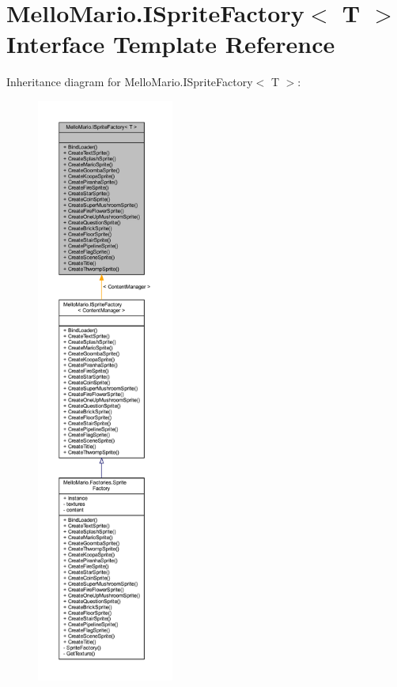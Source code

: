 \section{Mello\+Mario.\+I\+Sprite\+Factory$<$ T $>$ Interface Template Reference}
\label{interfaceMelloMario_1_1ISpriteFactory}


Inheritance diagram for Mello\+Mario.\+I\+Sprite\+Factory$<$ T $>$\+:
\nopagebreak
\begin{figure}[H]
\begin{center}
\leavevmode
\includegraphics[height=550pt]{interfaceMelloMario_1_1ISpriteFactory__inherit__graph}
\end{center}
\end{figure}


